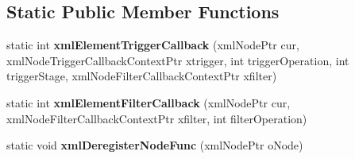 \subsection*{\-Static \-Public \-Member \-Functions}
\begin{DoxyCompactItemize}
\item 
\hypertarget{classgeneral__server_1_1LibXmlBaseNode_a15d006deec30aac8bf43d79dcb0797bc}{static int {\bfseries xml\-Element\-Trigger\-Callback} (xml\-Node\-Ptr cur, xml\-Node\-Trigger\-Callback\-Context\-Ptr xtrigger, int trigger\-Operation, int trigger\-Stage, xml\-Node\-Filter\-Callback\-Context\-Ptr xfilter)}\label{classgeneral__server_1_1LibXmlBaseNode_a15d006deec30aac8bf43d79dcb0797bc}

\item 
\hypertarget{classgeneral__server_1_1LibXmlBaseNode_acd817beb8473975eb89ebbf209519a31}{static int {\bfseries xml\-Element\-Filter\-Callback} (xml\-Node\-Ptr cur, xml\-Node\-Filter\-Callback\-Context\-Ptr xfilter, int filter\-Operation)}\label{classgeneral__server_1_1LibXmlBaseNode_acd817beb8473975eb89ebbf209519a31}

\item 
\hypertarget{classgeneral__server_1_1LibXmlBaseNode_a072e86c8206e09b1f0363dac231f386b}{static void {\bfseries xml\-Deregister\-Node\-Func} (xml\-Node\-Ptr o\-Node)}\label{classgeneral__server_1_1LibXmlBaseNode_a072e86c8206e09b1f0363dac231f386b}

\end{DoxyCompactItemize}
